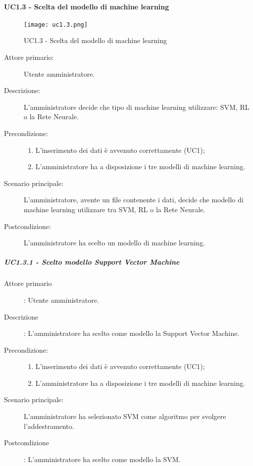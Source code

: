 \newpage

\paragraph{UC1.3 - Scelta del modello di machine learning}%
\label{sssec:uc1.3}

\begin{figure}[h!]
  \begin{center}
    \texttt{[image: uc1.3.png]}\\
    \caption{UC1.3 - Scelta del modello di machine learning}%
    \label{fig:uc1.3}
  \end{center}
\end{figure}

\begin{description}
  \item[Attore primario:] Utente amministratore.
  \item[Descrizione:] L'amministratore decide che tipo di machine learning utilizzare: SVM, RL o la Rete Neurale.
  \item[Precondizione:]
  \begin{enumerate}
    \item L'inserimento dei dati è avvenuto correttamente (UC1);
    \item L'amministratore ha a disposizione i tre modelli di machine learning.
  \end{enumerate}
  \item[Scenario principale:] L'amministratore, avente un file contenente i dati, decide che modello di machine learning utilizzare tra SVM, RL o la Rete Neurale.
  \item[Postcondizione:] L'amministratore ha scelto un modello di machine learning.
\end{description}

\subparagraph{UC1.3.1 - Scelto modello Support Vector Machine}%
\label{sssec:uc1.3.1}
\begin{description}
  \item[Attore primario]: Utente amministratore.
  \item[Descrizione]: L'amministratore ha scelto come modello la Support Vector Machine.
  \item[Precondizione:]
  \begin{enumerate}
    \item L'inserimento dei dati è avvenuto correttamente (UC1);
    \item L'amministratore ha a disposizione i tre modelli di machine learning.
  \end{enumerate}
  \item[Scenario principale:] L'amministratore ha selezionato SVM come algoritmo per svolgere l'addestramento.
  \item[Postcondizione]: L'amministratore ha scelto come modello la SVM.
\end{description}

